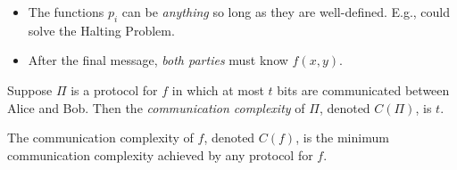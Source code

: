 \begin{itemize}
\item The functions $p_i$ can be \emph{anything} so long as they are well-defined.  E.g., could solve the Halting Problem.
\item After the final message, \emph{both parties} must know $f(x, y)$.
\end{itemize}
\pause
\begin{definition}
Suppose $\Pi$ is a protocol for $f$ in which at most $t$
bits are communicated between Alice and Bob.
Then the \emph{communication complexity} of $\Pi$,
	denoted $C(\Pi)$, is $t$.
\end{definition}
\pause
\begin{definition}[$C(f)$]
The communication complexity of $f$, denoted $C(f)$,
	is the minimum communication complexity
	achieved by any protocol for $f$.
\end{definition}